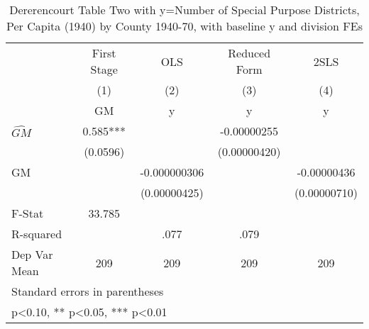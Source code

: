 \begin{table}[htbp]\centering
\def\sym#1{\ifmmode^{#1}\else\(^{#1}\)\fi}
\caption{Dererencourt Table Two with y=Number of Special Purpose Districts, Per Capita (1940) by County 1940-70, with baseline y and division FEs}
\begin{tabular}{l*{4}{c}}
\toprule
                    & First Stage   &         OLS   &Reduced Form   &        2SLS   \\
                    &\multicolumn{1}{c}{(1)}&\multicolumn{1}{c}{(2)}&\multicolumn{1}{c}{(3)}&\multicolumn{1}{c}{(4)}\\
                    &\multicolumn{1}{c}{GM}&\multicolumn{1}{c}{y}&\multicolumn{1}{c}{y}&\multicolumn{1}{c}{y}\\
\midrule
$\hat{GM}$          &       0.585***&               & -0.00000255   &               \\
                    &    (0.0596)   &               &(0.00000420)   &               \\
\addlinespace
GM                  &               &-0.000000306   &               & -0.00000436   \\
                    &               &(0.00000425)   &               &(0.00000710)   \\
\midrule
F-Stat              &      33.785   &               &               &               \\
R-squared           &               &        .077   &        .079   &               \\
Dep Var Mean        &         209   &         209   &         209   &         209   \\
\bottomrule
\multicolumn{5}{l}{\footnotesize Standard errors in parentheses}\\
\multicolumn{5}{l}{\footnotesize * p<0.10, ** p<0.05, *** p<0.01}\\
\end{tabular}
\end{table}
